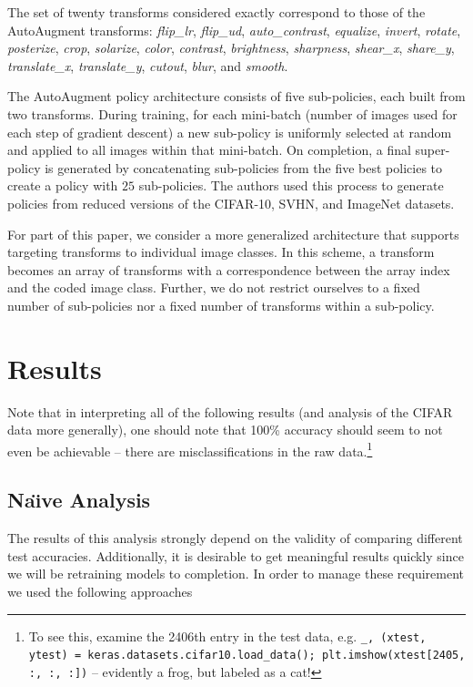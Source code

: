 \documentclass[10pt,twocolumn,letterpaper]{article}
\begin{document}
  The set of twenty transforms considered exactly correspond to those of the AutoAugment transforms: \textit{flip\_lr}, \textit{flip\_ud}, \textit{auto\_contrast}, \textit{equalize}, \textit{invert}, \textit{rotate}, \textit{posterize}, \textit{crop}, \textit{solarize}, \textit{color}, \textit{contrast}, \textit{brightness}, \textit{sharpness}, \textit{shear\_x}, \textit{share\_y}, \textit{translate\_x}, \textit{translate\_y}, \textit{cutout}, \textit{blur}, and \textit{smooth}.

  The AutoAugment policy architecture consists of five sub-policies, each built from two transforms. During training, for each mini-batch (number of images used for each step of gradient descent) a new sub-policy is uniformly selected at random and applied to all images within that mini-batch. On completion, a final super-policy is generated by concatenating sub-policies from the five best policies to create a policy with $25$ sub-policies. The authors used this process to generate policies from reduced versions of the CIFAR-10, SVHN, and ImageNet datasets.

  For part of this paper, we consider a more generalized architecture that supports targeting transforms to individual image classes. In this scheme, a transform becomes an array of transforms with a correspondence between the array index and the coded image class. Further, we do not restrict ourselves to a fixed number of sub-policies nor a fixed number of transforms within a sub-policy.

\section{Results}

  Note that in interpreting all of the following results (and analysis of the CIFAR data more generally), one should note that 100\% accuracy should seem to not even be achievable -- there are misclassifications in the raw data.\footnote{To see this, examine the 2406th entry in the test data, e.g. \texttt{\_, (xtest, ytest) = keras.datasets.cifar10.load\_data(); plt.imshow(xtest[2405, :, :, :])} -- evidently a frog, but labeled as a cat!}

	

  \subsection{Na\"{\i}ve Analysis}
    The results of this analysis strongly depend on the validity of comparing different test accuracies. Additionally, it is desirable to get meaningful results quickly since we will be retraining models to completion. In order to manage these requirement we used the following approaches
\end{document}
